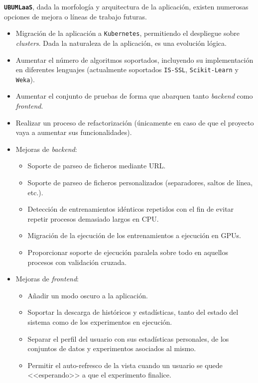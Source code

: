 \textbf{\texttt{UBUMLaaS}}, dada la morfología y arquitectura de la aplicación, existen numerosas opciones de mejora o líneas de trabajo futuras.
\begin{itemize}
\tightlist
\item Migración de la aplicación a \texttt{Kubernetes}, permitiendo el despliegue sobre \textit{clusters}. Dada la naturaleza de la aplicación, es una evolución lógica.
\item Aumentar el número de algoritmos soportados, incluyendo su implementación en diferentes lenguajes (actualmente soportados \texttt{IS-SSL}, \texttt{Scikit-Learn} y \texttt{Weka}).
\item Aumentar el conjunto de pruebas de forma que abarquen tanto \textit{backend} como \textit{frontend}.
\item Realizar un proceso de refactorización (únicamente en caso de que el proyecto vaya a aumentar sus funcionalidades).
\item Mejoras de \textit{backend}:
	\begin{itemize}
	\tightlist
	\item Soporte de parseo de ficheros mediante URL.
	\item Soporte de parseo de ficheros personalizados (separadores, saltos de línea, etc.).
	\item Detección de entrenamientos idénticos repetidos con el fin de evitar repetir procesos demasiado largos en CPU.
	\item Migración de la ejecución de los entrenamientos a ejecución en GPUs.
	\item Proporcionar soporte de ejecución paralela sobre todo en aquellos procesos con validación cruzada.
	\end{itemize}
\item Mejoras de \textit{frontend}:
	\begin{itemize}
	\tightlist
	\item Añadir un modo oscuro a la aplicación.
	\item Soportar la descarga de históricos y estadísticas, tanto del estado del sistema como de los experimentos en ejecución.
	\item Separar el perfil del usuario con sus estadísticas personales, de los conjuntos de datos y experimentos asociados al mismo.
	\item Permitir el auto-refresco de la vista cuando un usuario se quede <<esperando>> a que el experimento finalice.
	\end{itemize}
\end{itemize}

